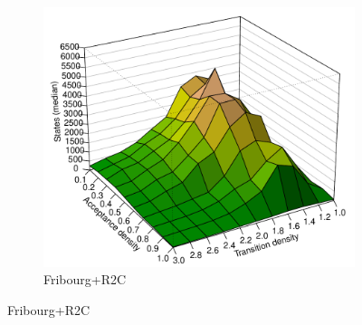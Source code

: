 \begin{figure}[ht]
\begin{subfigure}[t]{\perspwidth\textwidth}
  \includegraphics[width=\textwidth]{../results/figures/internal/goal/s.median.Fribourg+R2C.pdf}
  \caption{Fribourg+R2C}
  \end{subfigure}
  \hfill


\end{figure}

